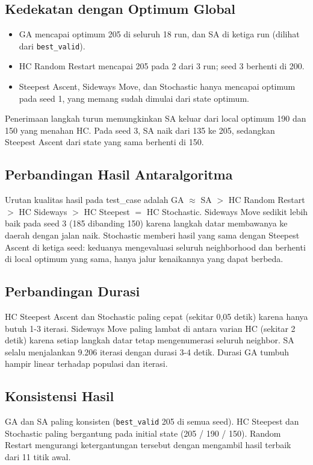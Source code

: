 \documentclass[12pt,a4paper]{report}
\newcommand{\code}[1]{\texttt{\small #1}}
\begin{document}
\subsection{Kedekatan dengan Optimum Global}
\begin{itemize}[leftmargin=1.5cm]
  \item GA mencapai optimum 205 di seluruh 18 run, dan SA di ketiga run (dilihat dari \code{best\_valid}).
  \item HC Random Restart mencapai 205 pada 2 dari 3 run; seed 3 berhenti di 200.
  \item Steepest Ascent, Sideways Move, dan Stochastic hanya mencapai optimum pada seed 1, yang memang sudah dimulai dari state optimum.
\end{itemize}
Penerimaan langkah turun memungkinkan SA keluar dari local optimum 190 dan 150 yang menahan
HC. Pada seed 3, SA naik dari 135 ke 205, sedangkan Steepest Ascent dari state yang sama berhenti
di 150.

\subsection{Perbandingan Hasil Antaralgoritma}
Urutan kualitas hasil pada test\_case adalah GA $\approx$ SA $>$ HC Random Restart $>$ HC Sideways
$>$ HC Steepest $=$ HC Stochastic. Sideways Move sedikit lebih baik pada seed 3 (185 dibanding 150)
karena langkah datar membawanya ke daerah dengan jalan naik. Stochastic memberi hasil
yang sama dengan Steepest Ascent di ketiga seed: keduanya mengevaluasi seluruh neighborhood dan
berhenti di local optimum yang sama, hanya jalur kenaikannya yang dapat berbeda.

\subsection{Perbandingan Durasi}
HC Steepest Ascent dan Stochastic paling cepat (sekitar 0,05 detik) karena hanya butuh 1-3
iterasi. Sideways Move paling lambat di antara varian HC (sekitar 2 detik) karena setiap langkah
datar tetap mengenumerasi seluruh neighbor. SA selalu menjalankan 9.206 iterasi dengan durasi 3-4
detik. Durasi GA tumbuh hampir linear terhadap populasi dan iterasi.

\subsection{Konsistensi Hasil}
GA dan SA paling konsisten (\code{best\_valid} 205 di semua seed). HC Steepest dan Stochastic
paling bergantung pada initial state (205 / 190 / 150). Random Restart mengurangi ketergantungan
tersebut dengan mengambil hasil terbaik dari 11 titik awal.
\end{document}
